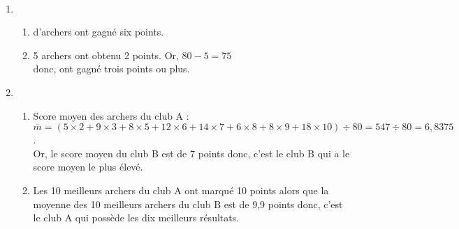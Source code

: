    \ \\ [-5mm]
   \begin{enumerate}
      \item
      \begin{enumerate}
         \item { d'archers} ont gagné six points.
         \item 5 archers ont obtenu 2 points. Or, $80-5 =75$ \\
            donc, { ont gagné trois points ou plus}.
      \end{enumerate}
      \setcounter{enumi}{1}
      \item
      \begin{enumerate}
         \item Score moyen des archers du club A : \\
            $\overline{m} =(5\times2+9\times3+8\times5+12\times6+14\times7+6\times8+8\times9+18\times10)\div80 =547\div80 =6,8375$. \\
            Or, le score moyen du club B est de 7 points donc, c'est {\blue le club B} qui a le score moyen le plus élevé.
         \item Les 10 meilleurs archers du club A ont marqué 10 points alors que la moyenne des 10 meilleurs archers du club B est de 9,9 points donc, c'est {\blue le club A} qui possède les dix meilleurs résultats.
      \end{enumerate}
   \end{enumerate}
